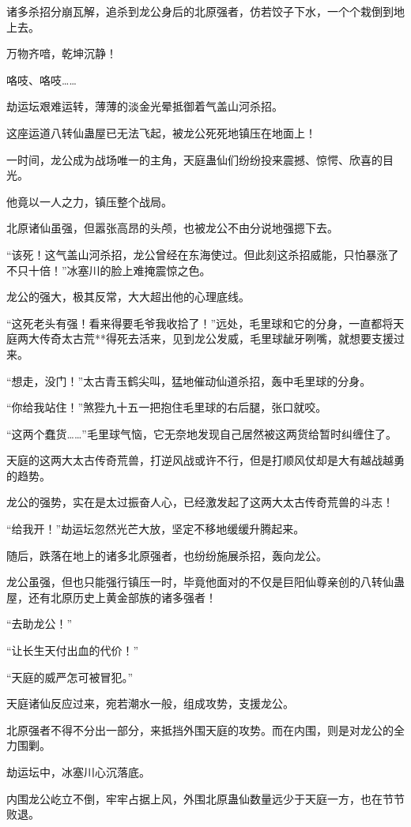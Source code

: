 \begin{this_body}
诸多杀招分崩瓦解，追杀到龙公身后的北原强者，仿若饺子下水，一个个栽倒到地上去。

万物齐喑，乾坤沉静！

咯吱、咯吱……

劫运坛艰难运转，薄薄的淡金光晕抵御着气盖山河杀招。

这座运道八转仙蛊屋已无法飞起，被龙公死死地镇压在地面上！

一时间，龙公成为战场唯一的主角，天庭蛊仙们纷纷投来震撼、惊愕、欣喜的目光。

他竟以一人之力，镇压整个战局。

北原诸仙虽强，但嚣张高昂的头颅，也被龙公不由分说地强摁下去。

“该死！这气盖山河杀招，龙公曾经在东海使过。但此刻这杀招威能，只怕暴涨了不只十倍！”冰塞川的脸上难掩震惊之色。

龙公的强大，极其反常，大大超出他的心理底线。

“这死老头有强！看来得要毛爷我收拾了！”远处，毛里球和它的分身，一直都将天庭两大传奇太古荒**得死去活来，见到龙公发威，毛里球龇牙咧嘴，就想要支援过来。

“想走，没门！”太古青玉鹤尖叫，猛地催动仙道杀招，轰中毛里球的分身。

“你给我站住！”煞狴九十五一把抱住毛里球的右后腿，张口就咬。

“这两个蠢货……”毛里球气恼，它无奈地发现自己居然被这两货给暂时纠缠住了。

天庭的这两大太古传奇荒兽，打逆风战或许不行，但是打顺风仗却是大有越战越勇的趋势。

龙公的强势，实在是太过振奋人心，已经激发起了这两大太古传奇荒兽的斗志！

“给我开！”劫运坛忽然光芒大放，坚定不移地缓缓升腾起来。

随后，跌落在地上的诸多北原强者，也纷纷施展杀招，轰向龙公。

龙公虽强，但也只能强行镇压一时，毕竟他面对的不仅是巨阳仙尊亲创的八转仙蛊屋，还有北原历史上黄金部族的诸多强者！

“去助龙公！”

“让长生天付出血的代价！”

“天庭的威严怎可被冒犯。”

天庭诸仙反应过来，宛若潮水一般，组成攻势，支援龙公。

北原强者不得不分出一部分，来抵挡外围天庭的攻势。而在内围，则是对龙公的全力围剿。

劫运坛中，冰塞川心沉落底。

内围龙公屹立不倒，牢牢占据上风，外围北原蛊仙数量远少于天庭一方，也在节节败退。


\end{this_body}
